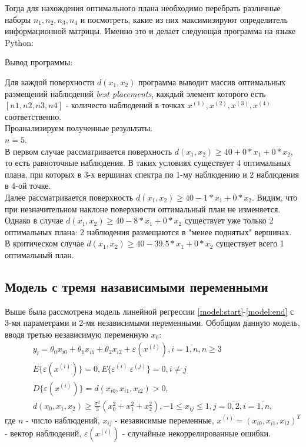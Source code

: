 	 Тогда для нахождения оптимального плана необходимо перебрать различные наборы $n_1, n_2, n_3, n_4$ и посмотреть, какие из них максимизируют определитель информационной матрицы. Именно это и делает следующая программа на языке Python:
	 
	
	 
	 Вывод программы:
	 


	Для каждой поверхности $d(x_1, x_2)$ программа выводит массив оптимальных размещений наблюдений \textit{best placements}, каждый элемент которого есть $[n1, n2, n3, n4]$ -  количесто наблюдений в точках $x^{(1)}, x^{(2)}, x^{(3)}, x^{(4)}$ соответственно.\\
	Проанализируем полученные результаты.\\
	$n = 5$.\\
	В первом случае рассматривается поверхность $d(x_1, x_2) \ge 40 + 0*x_1 + 0*x_2$, то есть равноточные наблюдения. В таких условиях существует 4 оптимальных плана, при которых в 3-х вершинах спектра по 1-му наблюдению и 2 наблюдения в 4-ой точке. \\
	Далее рассматривается поверхность $d(x_1, x_2) \ge 40 - 1*x_1 + 0*x_2$. Видим, что при незначительном наклоне поверхности оптимальный план не изменяется. \\
	Однако в случае $d(x_1, x_2) \ge 40 - 8*x_1 + 0*x_2$ существует уже только 2 оптимальных плана: 2 наблюдения размещаются в "менее поднятых" вершинах.\\
	В критическом случае $d(x_1, x_2) \ge 40 - 39.5*x_1 + 0*x_2$ существует всего 1 оптимальный план.
	
\subsection{Модель с тремя назависимыми переменными}
	Выше была рассмотрена модель линейной регрессии \eqref{model:start}-\eqref{model:end} с 3-мя параметрами и 2-мя независимыми переменными.
	Обобщим данную модель, вводя третью независимую переменную $x_0$:
	\begin{gather} \label{model-3x:start}
		y_i = \theta_0 x_{i0} + \theta_1 x_{i1} + \theta_2 x_{i2} + \varepsilon(x^{(i)}), i = \overline{1, n}, n \ge 3 \\
		E\{ \varepsilon(x^{(i)}) \} = 0, E\{ \varepsilon^{(i)}\ \varepsilon^{(j)} \} = 0, i \ne j \\
		D\{ \varepsilon(x^{(i)}) \} = d(x_{i0}, x_{i1}, x_{i2}) > 0, \\
		d(x_0, x_1, x_2) \ge \frac{\sigma^2}{3}(x_0^2 + x_1^2 + x_2^2) \label{model-3x:end},
		-1 \le x_{ij} \le 1, j = \overline{0, 2}, i = \overline{1, n},
	\end{gather}
	где $n$ - число наблюдений, $x_{ij}$ - независимые переменные, $x^{(i)} = (x_{i0}, x_{i1}, x_{i2})^T$ - вектор наблюдений, $\varepsilon(x^{(i)})$ - случайные некоррелированные ошибки.
	
